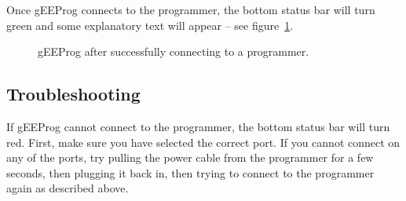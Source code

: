 \documentclass[letter]{article}
\begin{document}
Once gEEProg connects to the programmer, the bottom status bar will turn green and some explanatory text will appear -- see figure~\ref{fig:connected}.
\begin{figure}
	\centering
	\caption{gEEProg after successfully connecting to a programmer.}
	\label{fig:connected}
\end{figure}

\subsection*{Troubleshooting}
If gEEProg cannot connect to the programmer, the bottom status bar will turn red.
First, make sure you have selected the correct port.
If you cannot connect on any of the ports, try pulling the power cable from the programmer for a few seconds, then plugging it back in, then trying to connect to the programmer again as described above.
\end{document}
